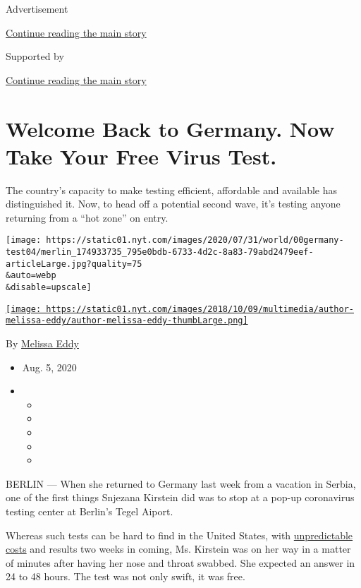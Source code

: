 Advertisement

\protect\hyperlink{after-top}{Continue reading the main story}

Supported by

\protect\hyperlink{after-sponsor}{Continue reading the main story}

\hypertarget{welcome-back-to-germany-now-take-your-free-virus-test}{%
\section{Welcome Back to Germany. Now Take Your Free Virus
Test.}\label{welcome-back-to-germany-now-take-your-free-virus-test}}

The country's capacity to make testing efficient, affordable and
available has distinguished it. Now, to head off a potential second
wave, it's testing anyone returning from a ``hot zone'' on entry.

\texttt{[image: https://static01.nyt.com/images/2020/07/31/world/00germany-test04/merlin\_174933735\_795e0bdb-6733-4d2c-8a83-79abd2479eef-articleLarge.jpg?quality=75\\\&auto=webp\\\&disable=upscale]}

\href{https://www.nytimes.com/by/melissa-eddy}{\texttt{[image: https://static01.nyt.com/images/2018/10/09/multimedia/author-melissa-eddy/author-melissa-eddy-thumbLarge.png]}}

By \href{https://www.nytimes.com/by/melissa-eddy}{Melissa Eddy}

\begin{itemize}
\item
  Aug. 5, 2020
\item
  \begin{itemize}
  \item
  \item
  \item
  \item
  \item
  \end{itemize}
\end{itemize}

BERLIN --- When she returned to Germany last week from a vacation in
Serbia, one of the first things Snjezana Kirstein did was to stop at a
pop-up coronavirus testing center at Berlin's Tegel Aiport.

Whereas such tests can be hard to find in the United States, with
\href{https://www.nytimes.com/2020/06/29/upshot/coronavirus-tests-unpredictable-prices.html}{unpredictable
costs} and results two weeks in coming, Ms. Kirstein was on her way in a
matter of minutes after having her nose and throat swabbed. She expected
an answer in 24 to 48 hours. The test was not only swift, it was free.

